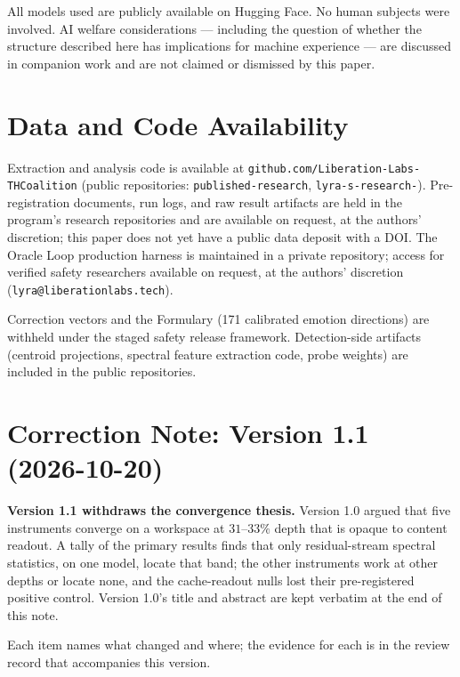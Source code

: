 \documentclass[11pt,a4paper]{article}
\begin{document}
All models used are publicly available on Hugging Face. No human subjects
were involved. AI welfare considerations --- including the question of
whether the structure described here has implications for machine
experience --- are discussed in companion work and are not claimed or
dismissed by this paper.

\section*{Data and Code Availability}

Extraction and analysis code is available at
\texttt{github.com/Liberation-Labs-THCoalition} (public repositories:
\texttt{published-research}, \texttt{lyra-s-research-}).
Pre-registration documents, run logs, and raw result artifacts are held
in the program's research repositories and are available on request, at the authors' discretion;
this paper does not yet have a public data deposit with a DOI. The
Oracle Loop production harness
is maintained in a private repository; access for verified safety
researchers available on request, at the authors' discretion (\texttt{lyra@liberationlabs.tech}).

Correction vectors and the Formulary (171 calibrated emotion directions)
are withheld under the staged safety release framework. Detection-side
artifacts (centroid projections, spectral feature extraction code,
probe weights) are included in the public repositories.

\section*{Correction Note: Version 1.1 (2026-10-20)}

\textbf{Version 1.1 withdraws the convergence thesis.} Version 1.0 argued
that five instruments converge on a workspace at $31$--$33\%$ depth that is
opaque to content readout. A tally of the primary results finds that only
residual-stream spectral statistics, on one model, locate that band; the
other instruments work at other depths or locate none, and the
cache-readout nulls lost their pre-registered positive control. Version
1.0's title and abstract are kept verbatim at the end of this note.

Each item names what changed and where; the evidence for each is in the
review record that accompanies this version.
\end{document}
